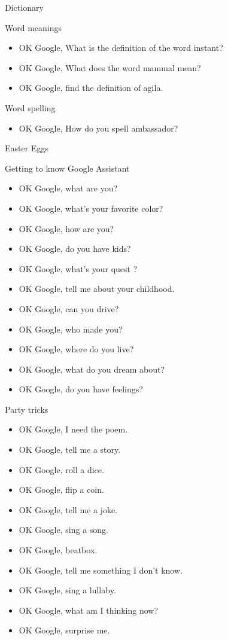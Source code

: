 \documentclass[
  a4paper,
]{article}
\providecommand{\tightlist}{%
  \setlength{\itemsep}{0pt}\setlength{\parskip}{0pt}}\usepackage{longtable,booktabs,array}
\begin{document}
Dictionary

Word meanings

\begin{itemize}
\tightlist
\item
  OK Google, What is the definition of the word instant?
\item
  OK Google, What does the word mammal mean?
\item
  OK Google, find the definition of agila.
\end{itemize}

Word spelling

\begin{itemize}
\tightlist
\item
  OK Google, How do you spell ambassador?
\end{itemize}

Easter Eggs

Getting to know Google Assistant

\begin{itemize}
\item
  OK Google, what are you?
\item
  OK Google, what's your favorite color?
\item
  OK Google, how are you?
\item
  OK Google, do you have kids?
\item
  OK Google, what's your quest ?
\item
  OK Google, tell me about your childhood.
\item
  OK Google, can you drive?
\item
  OK Google, who made you?
\item
  OK Google, where do you live?
\item
  OK Google, what do you dream about?
\item
  OK Google, do you have feelings?
\end{itemize}

Party tricks

\begin{itemize}
\item
  OK Google, I need the poem.
\item
  OK Google, tell me a story.
\item
  OK Google, roll a dice.
\item
  OK Google, flip a coin.
\item
  OK Google, tell me a joke.
\item
  OK Google, sing a song.
\item
  OK Google, beatbox.
\item
  OK Google, tell me something I don't know.
\item
  OK Google, sing a lullaby.
\item
  OK Google, what am I thinking now?
\item
  OK Google, surprise me.
\end{itemize}
\end{document}
